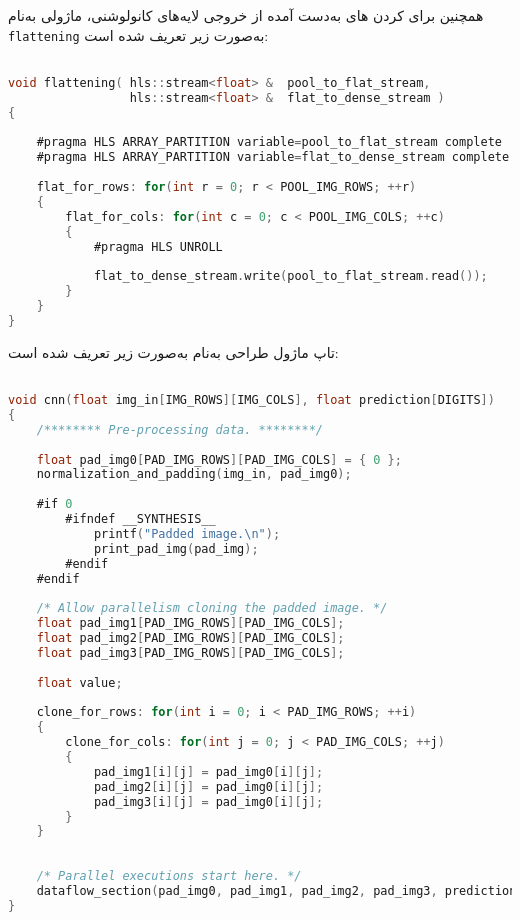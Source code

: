 همچنین برای  کردن  های به‌دست آمده از خروجی لایه‌های کانولوشنی، ماژولی به‌نام \texttt{flattening} به‌صورت زیر تعریف شده است:

\begin{latin}
\begin{lstlisting}[language=C,caption={HLS Implementation of Flatten Layers}]

void flattening( hls::stream<float> &  pool_to_flat_stream,
				 hls::stream<float> &  flat_to_dense_stream )
{
	
	#pragma HLS ARRAY_PARTITION variable=pool_to_flat_stream complete
	#pragma HLS ARRAY_PARTITION variable=flat_to_dense_stream complete
	
	flat_for_rows: for(int r = 0; r < POOL_IMG_ROWS; ++r)
	{
		flat_for_cols: for(int c = 0; c < POOL_IMG_COLS; ++c)
		{
			#pragma HLS UNROLL
			
			flat_to_dense_stream.write(pool_to_flat_stream.read());
		}
	}
}
\end{lstlisting}
\end{latin}


تاپ ماژول طراحی به‌نام  به‌صورت زیر تعریف شده است: \newpage

\begin{latin}
\begin{lstlisting}[language=C,caption={HLS Implementation of \texttt{CNN} Top Module}]

void cnn(float img_in[IMG_ROWS][IMG_COLS], float prediction[DIGITS])
{
	/******** Pre-processing data. ********/
	
	float pad_img0[PAD_IMG_ROWS][PAD_IMG_COLS] = { 0 };
	normalization_and_padding(img_in, pad_img0);
	
	#if 0
		#ifndef __SYNTHESIS__
			printf("Padded image.\n");
			print_pad_img(pad_img);
		#endif
	#endif
	
	/* Allow parallelism cloning the padded image. */
	float pad_img1[PAD_IMG_ROWS][PAD_IMG_COLS];
	float pad_img2[PAD_IMG_ROWS][PAD_IMG_COLS];
	float pad_img3[PAD_IMG_ROWS][PAD_IMG_COLS];
	
	float value;
	
	clone_for_rows: for(int i = 0; i < PAD_IMG_ROWS; ++i)
	{
		clone_for_cols: for(int j = 0; j < PAD_IMG_COLS; ++j)
		{
			pad_img1[i][j] = pad_img0[i][j];
			pad_img2[i][j] = pad_img0[i][j];
			pad_img3[i][j] = pad_img0[i][j];
		}
	}
	
	
	/* Parallel executions start here. */
	dataflow_section(pad_img0, pad_img1, pad_img2, pad_img3, prediction);
}

\end{lstlisting}
\end{latin}




